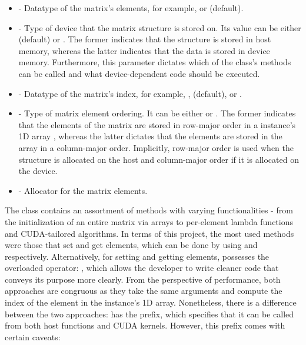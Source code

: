 \begin{itemize}
	\item {} - Datatype of the matrix's elements, for example,  or  (default).
	\item {} - Type of device that the matrix structure is stored on. Its value can be either  (default) or . The former indicates that the structure is stored in host memory, whereas the latter indicates that the data is stored in device memory. Furthermore, this parameter dictates which of the class's methods can be called and what device-dependent code should be executed.
	\item {} - Datatype of the matrix's index, for example, ,  (default), or .
	\item {} - Type of matrix element ordering. It can be either  or . The former indicates that the elements of the matrix are stored in row-major order in a  instance's 1D array , whereas the latter dictates that the elements are stored in the array in a column-major order. Implicitly, row-major order is used when the structure is allocated on the host and column-major order if it is allocated on the device.
	\item {} - Allocator for the matrix elements.
\end{itemize}

The  class contains an assortment of methods with varying functionalities - from the initialization of an entire matrix via arrays to per-element lambda functions and CUDA-tailored algorithms. In terms of this project, the most used methods were those that set and get elements, which can be done by using  and  respectively. Alternatively, for setting and getting elements,  possesses the overloaded operator: , which allows the developer to write cleaner code that conveys its purpose more clearly. From the perspective of performance, both approaches are congruous as they take the same arguments and compute the index of the element in the instance's 1D array. Nonetheless, there is a difference between the two approaches:  has the  prefix, which specifies that it can be called from both host functions and CUDA kernels. However, this prefix comes with certain caveats:

